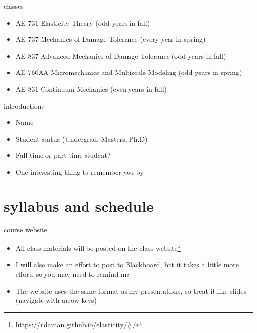 \documentclass[
  letterpaper,
  ignorenonframetext,
  aspectratio=43,
  handout,
  12pt]{beamer}
\DeclareRobustCommand{\href}[2]{#2\footnote{\url{#1}}}
\providecommand{\tightlist}{%
  \setlength{\itemsep}{0pt}\setlength{\parskip}{0pt}}
\providecommand{\tightlist}{%
\setlength{\itemsep}{0pt}\setlength{\parskip}{0pt}}
\begin{document}
\begin{frame}{classes}
\protect\hypertarget{classes}{}
\begin{itemize}
\tightlist
\item
  AE 731 Elasticity Theory (odd years in fall)
\item
  AE 737 Mechanics of Damage Tolerance (every year in spring)
\item
  AE 837 Advanced Mechanics of Damage Tolerance (odd years in fall)
\item
  AE 760AA Micromechanics and Multiscale Modeling (odd years in spring)
\item
  AE 831 Continuum Mechanics (even years in fall)
\end{itemize}
\end{frame}

\begin{frame}{introductions}
\protect\hypertarget{introductions}{}
\begin{itemize}
\tightlist
\item
  Name
\item
  Student status (Undergrad, Masters, Ph.D)
\item
  Full time or part time student?
\item
  One interesting thing to remember you by
\end{itemize}
\end{frame}

\hypertarget{syllabus-and-schedule}{%
\section{syllabus and schedule}\label{syllabus-and-schedule}}

\begin{frame}{course website}
\protect\hypertarget{course-website}{}
\begin{itemize}
\tightlist
\item
  All class materials will be posted on the
  \href{https://ndaman.github.io/elasticity/\#/}{class website}
\item
  I will also make an effort to post to Blackboard, but it takes a
  little more effort, so you may need to remind me
\item
  The website uses the same format as my presentations, so treat it like
  slides (navigate with arrow keys)
\end{itemize}
\end{frame}
\end{document}
